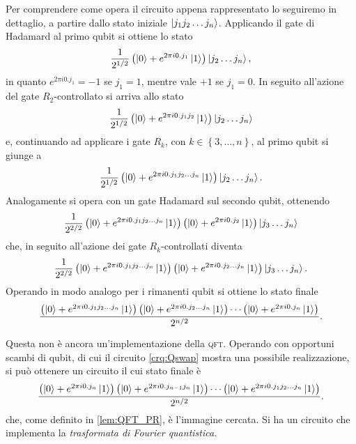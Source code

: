 Per comprendere come opera il circuito appena rappresentato lo seguiremo in dettaglio, a partire dallo stato iniziale $\ket{j_1j_2 \dots j_n}$. Applicando il gate di Hadamard al primo qubit si ottiene lo stato
\begin{equation}
 \frac{1}{2^{1/2}} \left( \ket{0} + e^{2 \pi i 0.j_1} \ket{1} \right) \ket{j_2 \dots j_n},
\end{equation}
in quanto $e^{2 \pi i 0.j_1} = -1$ se $j_1 = 1$, mentre vale $+1$ se $j_1 = 0$.
In seguito all'azione del gate $R_2$-controllato si arriva allo stato
\begin{equation}
 \frac{1}{2^{1/2}} \left( \ket{0} + e^{2 \pi i 0.j_1j_2} \ket{1} \right) \ket{j_2 \dots j_n}
\end{equation}
e, continuando ad applicare i gate $R_k$, con $k \in \left\{3, \dots, n \right\}$, al primo qubit si giunge a
\begin{equation}
 \frac{1}{2^{1/2}} \left( \ket{0} + e^{2 \pi i 0.j_1j_2 \dots j_n} \ket{1} \right) \ket{j_2 \dots j_n}.
\end{equation}
Analogamente si opera con un gate Hadamard sul secondo qubit, ottenendo
\begin{equation}
 \frac{1}{2^{2/2}} \left( \ket{0} + e^{2 \pi i 0.j_1j_2 \dots j_n} \ket{1} \right) \left( \ket{0} + e^{2 \pi i 0.j_2} \ket{1} \right) \ket{j_3 \dots j_n}
\end{equation}
che, in seguito all'azione dei gate $R_k$-controllati diventa
\begin{equation}
 \frac{1}{2^{2/2}} \left( \ket{0} + e^{2 \pi i 0.j_1j_2 \dots j_n} \ket{1} \right) \left( \ket{0} + e^{2 \pi i 0.j_2 \dots j_n} \ket{1} \right) \ket{j_3 \dots j_n}.
\end{equation}
Operando in modo analogo per i rimanenti qubit si ottiene lo stato finale
\begin{equation}
 \frac{\left( \ket{0} + e^{2 \pi i 0.j_1j_2 \dots j_n} \ket{1} \right) \left( \ket{0} + e^{2 \pi i 0.j_2 \dots j_n} \ket{1} \right) \cdots \left( \ket{0} + e^{2 \pi i 0.j_n} \ket{1} \right)}{2^{n/2}}.
\end{equation}

Questa non è ancora un'implementazione della \textsc{qft}. Operando con opportuni scambi di qubit, di cui il circuito \eqref{crq:Qswap} mostra una possibile realizzazione, si può ottenere un circuito il cui stato finale è
\begin{equation}
 \frac{\left( \ket{0} + e^{2 \pi i 0.j_n} \ket{1} \right) \left( \ket{0} + e^{2 \pi i 0.j_{n-1}j_n} \ket{1} \right) \cdots \left( \ket{0} + e^{2 \pi i 0.j_1j_2 \dots j_n} \ket{1} \right)}{2^{n/2}}.
\end{equation}
che, come definito in \eqref{lem:QFT_PR}, è l'immagine cercata.
Si ha un circuito che implementa la \textit{trasformata di Fourier quantistica}.

